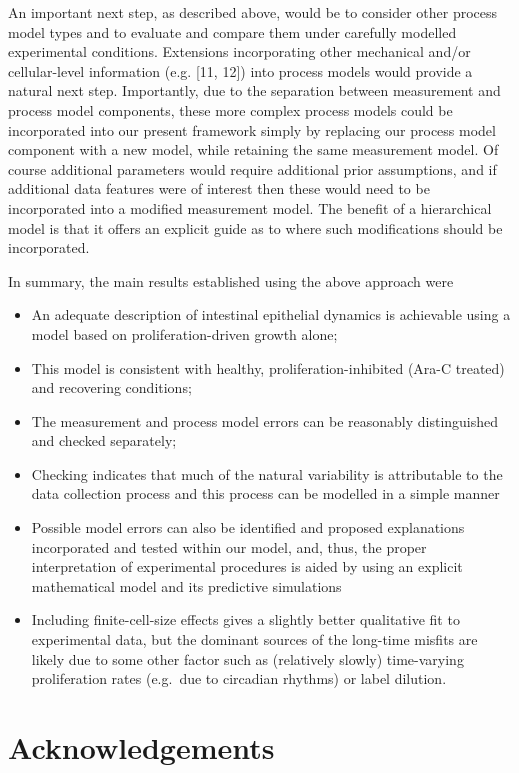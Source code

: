 \documentclass[10pt,letterpaper]{article}
\def\tightlist{}
\begin{document}
An important next step, as described above, would be to consider other
process model types and to evaluate and compare them under carefully
modelled experimental conditions. Extensions incorporating other
mechanical and/or cellular-level information (e.g. {[}11, 12{]}) into
process models would provide a natural next step. Importantly, due to
the separation between measurement and process model components, these
more complex process models could be incorporated into our present
framework simply by replacing our process model component with a new
model, while retaining the same measurement model. Of course additional
parameters would require additional prior assumptions, and if additional
data features were of interest then these would need to be incorporated
into a modified measurement model. The benefit of a hierarchical model
is that it offers an explicit guide as to where such modifications
should be incorporated.

In summary, the main results established using the above approach were

\begin{itemize}
\tightlist
\item
  An adequate description of intestinal epithelial dynamics is
  achievable using a model based on proliferation-driven growth alone;
\item
  This model is consistent with healthy, proliferation-inhibited (Ara-C
  treated) and recovering conditions;
\item
  The measurement and process model errors can be reasonably
  distinguished and checked separately;
\item
  Checking indicates that much of the natural variability is
  attributable to the data collection process and this process can be
  modelled in a simple manner
\item
  Possible model errors can also be identified and proposed explanations
  incorporated and tested within our model, and, thus, the proper
  interpretation of experimental procedures is aided by using an
  explicit mathematical model and its predictive simulations
\item
  Including finite-cell-size effects gives a slightly better qualitative
  fit to experimental data, but the dominant sources of the long-time
  misfits are likely due to some other factor such as (relatively
  slowly) time-varying proliferation rates (e.g.~due to circadian
  rhythms) or label dilution.
\end{itemize}

\section{Acknowledgements}\label{acknowledgements}
\end{document}

